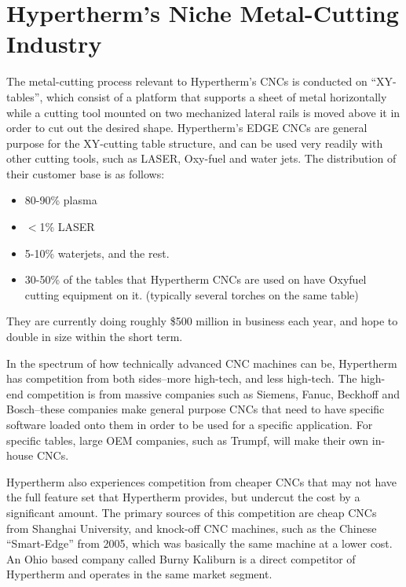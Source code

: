 \documentclass[12pt,letterpaper,titlepage]{article}
\newlength{\wideitemsep}
\let\olditem\item
\renewcommand{\item}{\setlength{\itemsep}{\wideitemsep}\olditem}
\begin{document}
\newpage
\appendix
{} \label{sec:AppendixA}

\newpage
\section{Hypertherm's Niche Metal-Cutting Industry}\label{tab:HyperthermInIndustry}

The metal-cutting process relevant to Hypertherm’s CNCs is conducted on “XY-tables”, which consist of a platform that supports a sheet of metal horizontally while a cutting tool mounted on two mechanized lateral rails is moved above it in order to cut out the desired shape. Hypertherm’s EDGE CNCs are general purpose for the XY-cutting table structure, and can be used very readily with other cutting tools, such as LASER, Oxy-fuel and water jets. The distribution of their customer base is as follows:

\begin{itemize}

\item 80-90\% plasma

\item $<$1\% LASER

\item5-10\% waterjets, and the rest.

\item 30-50\% of the tables that Hypertherm CNCs are used on have Oxyfuel cutting equipment on it. (typically several torches on the same table)

\end{itemize}

They are currently doing roughly \$500 million in business each year, and hope to double in size within the short term.

In the spectrum of how technically advanced CNC machines can be, Hypertherm has competition from both sides--more high-tech, and less high-tech. The high-end competition is from massive companies such as Siemens, Fanuc, Beckhoff and Bosch--these companies make general purpose CNCs that need to have specific software loaded onto them in order to be used for a specific application. For specific tables, large OEM companies, such as Trumpf, will make their own in-house CNCs.

Hypertherm also experiences competition from cheaper CNCs that may not have the full feature set that Hypertherm provides, but undercut the cost by a significant amount. The primary sources of this competition are cheap CNCs from Shanghai University, and knock-off CNC machines, such as the Chinese “Smart-Edge” from 2005, which was basically the same machine at a lower cost. An Ohio based company called Burny Kaliburn is a direct competitor of Hypertherm and operates in the same market segment.
\end{document}
